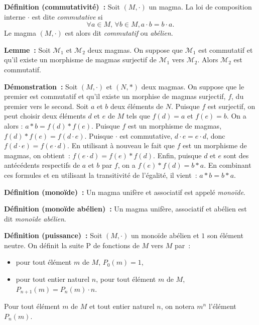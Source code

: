     \hfill \square

\medskip

\noindent\textbf{Définition (commutativité) :} Soit $(M,\cdot)$ un magma.
    La loi de composition interne $\cdot$ est dite \textit{commutative} si
    \begin{equation*}
        \forall a \in M, \, \forall b \in M,  
        a \cdot b = b \cdot a.
    \end{equation*}
    Le magma $(M, \cdot)$ est alors dit \textit{commutatif} ou \textit{abélien}.

\medskip

\noindent\textbf{Lemme :} Soit $\mathcal{M}_1$ et $\mathcal{M}_2$ deux magmas.
    On suppose que $\mathcal{M}_1$ est commutatif et qu'il existe un morphisme de magmas surjectif de $\mathcal{M}_1$ vers $\mathcal{M}_2$.
    Alors $\mathcal{M}_2$ est commutatif.

\medskip

\noindent\textbf{Démonstration :} Soit $(M,\cdot)$ et $(N,\ast)$ deux magmas. 
    On suppose que le premier est commutatif et qu'il existe un morphise de magmas surjectif, $f$, du premier vers le second. 
    Soit $a$ et $b$ deux éléments de $N$. 
    Puisque $f$ est surjectif, on peut choisir deux éléments $d$ et $e$ de $M$ tels que $f(d) = a$ et $f(e) = b$.
    On a alors : $a \ast b = f(d) \ast f(e)$.
    Puisque $f$ est un morphisme de magmas, $f(d) \ast f(e) = f(d \cdot e)$.
    Puisque $\cdot$ est commutative, $d \cdot e = e \cdot d$, donc $f(d \cdot e) = f(e \cdot d)$. 
    En utilisant à nouveau le fait que $f$ est un morphisme de magmas, on obtient : $f(e \cdot d) = f(e) \ast f(d)$. 
    Enfin, puisque $d$ et $e$ sont des antécédents respectifs de $a$ et $b$ par $f$, on a $f(e) \ast f(d) = b \ast a$. 
    En combinant ces formules et en utilisant la transitivité de l'égalité, il vient : $a \ast b = b \ast a$.

    \hfill \square

\medskip

\noindent\textbf{Définition (monoïde) :} Un magma unifère et associatif est appelé \textit{monoïde}.

\medskip

\noindent\textbf{Définition (monoïde abélien) :} Un magma unifère, associatif et abélien est dit \textit{monoïde abélien}.

\medskip

\noindent\textbf{Définition (puissance) :} Soit $(M,\cdot)$ un monoïde abélien et $1$ son élément neutre.
    On définit la suite $\mathrm{P}$ de fonctions de $M$ vers $M$ par : 
    \begin{itemize}[nosep]
        \item pour tout élément $m$ de $M$, $P_0(m) = 1$,
        \item pour tout entier naturel $n$, pour tout élément $m$ de $M$, $P_{n+1}(m) = P_n(m) \cdot n$.
    \end{itemize}
    Pour tout élément $m$ de $M$ et tout entier naturel $n$, on notera $m^n$ l'élément $P_n(m)$.

